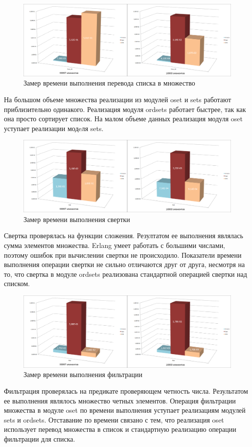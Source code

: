 		\begin{figure}[H]
				\centering
				\includegraphics[width=\textwidth]{img/histograms/from_list.png}
				\caption{Замер времени выполнения перевода списка в множество}
		\end{figure}
		На большом объеме множества реализации из модулей oset и sets работают приблизительно одинакого.
		Реализация модуля ordsets работает быстрее, так как она просто сортирует список.
		На малом объеме данных реализация модуля oset уступает реализации модeля sets.
		
		\begin{figure}[H]
				\centering
				\includegraphics[width=\textwidth]{img/histograms/fold.png}
				\caption{Замер времени выполнения свертки}
		\end{figure}
		Свертка проверялась на функции сложения. Резултатом ее выполнения являлась сумма элементов множества.
		Erlang умеет работать с большими числами, поэтому ошибок при вычислении свертки не происходило.
		Показатели времени выполнения операции свертки не сильно отличаются друг от друга, несмотря на то, что
		свертка в модуле ordsets реализована стандартной операцией свертки над списком. 

		\begin{figure}[H]
				\centering
				\includegraphics[width=\textwidth]{img/histograms/filter.png}
				\caption{Замер времени выполнения фильтрации}
		\end{figure}
		Фильтрация проверялась на предикате проверяющем четность числа. Результатом ее выполнения являлось множество
		четных элементов. Операция фильтрации множества в модуле oset по времени выполнения уступает реализациям 
		модулей sets и ordsets. Отставание по времени связано с тем, что реализация oset использует перевод множества в 
		список и стандартную реализацию операции фильтрации для списка.


